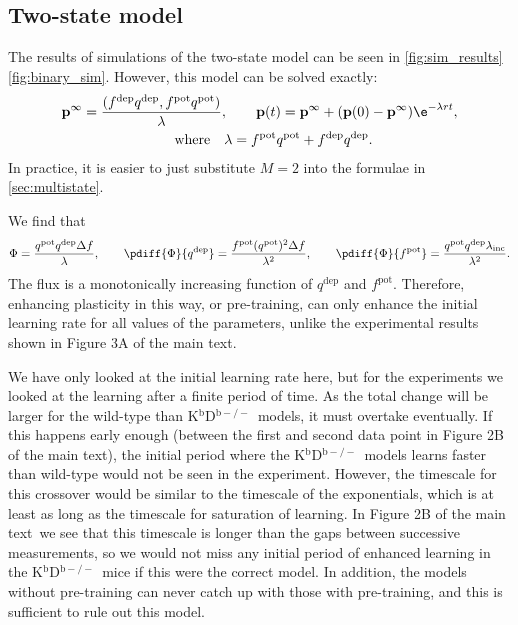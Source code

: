 \documentclass[10pt]{article}
\newcommand{\pr}{\mathbf{p}}
\newcommand{\eq}{\pr^\infty}
\newcommand{\pot}{^{\text{pot}}}
\newcommand{\dep}{^{\text{dep}}}
\newcommand{\inc}{_{\text{inc}}}
\newcommand{\KO}{K$^\mathrm{b}$D$^{\mathrm{b}-/-}$}
\newcommand{\modelfig}[1][A]{Figure 3#1 of the main text}
\newcommand{\datafig}[1][B]{Figure 2#1 of the main text}
\begin{document}



\subsection{Two-state model}\label{sec:binary}




The results of simulations of the two-state model can be seen in
\autoref{fig:sim_results}\ref{fig:binary_sim}.
However, this model can be solved exactly:
%
\begin{multline}\label{eq:binarysol}
  \eq = \frac{(f\dep q\dep, f\pot q\pot)}{\lambda},
  \qquad
  \pr(t) = \eq + (\pr(0)-\eq)\e^{-\lambda rt},\\
  \qquad \text{where} \quad
  \lambda = f\pot q\pot + f\dep q\dep.
\end{multline}
%
In practice, it is easier to just substitute $M=2$ into the formulae in \autoref{sec:multistate}.

We find that
%
\begin{equation}\label{eq:binaryflux}
  \Phi = \frac{q\pot q\dep \Delta f}{\lambda}, \qquad
  \pdiff{\Phi}{q\dep} = \frac{f\pot (q\pot)^2 \Delta f}{\lambda^2}, \qquad
  \pdiff{\Phi}{f\pot} = \frac{q\pot q\dep \lambda\inc}{\lambda^2}.
\end{equation}
%
The flux is a monotonically increasing function of $q\dep$ and $f\pot$.
Therefore, enhancing plasticity in this way, or pre-training, can only enhance the initial learning rate for all values of the parameters, unlike the experimental results shown in \modelfig.



We have only looked at the initial learning rate here, but for the experiments we looked at the learning after a finite period of time.
As the total change will be larger for the wild-type than \KO\ models, it must overtake eventually.
If this happens early enough (\ie between the first and second data point in \datafig), the initial period where the \KO\ models learns faster than wild-type would not be seen in the experiment.
However, the timescale for this crossover would be similar to the timescale of the exponentials, which is at least as long as the timescale for saturation of learning.
In \datafig\ we see that this timescale is longer than the gaps between successive measurements, so we would not miss any initial period of enhanced learning in the \KO\ mice if this were the correct model.
In addition, the models without pre-training can never catch up with those with pre-training, and this is sufficient to rule out this model.
\end{document}
